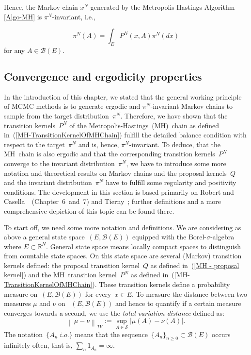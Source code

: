 Hence, the Markov chain $ x^{N} $ generated by the Metropolis-Hastings Algorithm \ref{Algo-MH} is $ \pi^{N} $-invariant, i.e.,

\begin{equation}
 \pi^{N} (A) = \int_{E} P^{N}(x,A) \pi^{N}(dx)
\end{equation}
for any $ A \in \mathcal{B}(E) $.



\subsection{Convergence and ergodicity properties}
\label{MH-ConvergenceProperties}

In the introduction of this chapter, we stated that the general working principle of MCMC methods is to generate ergodic and $\pi^{N}$-invariant Markov chains to sample from the target distribution~$\pi^{N}$. Therefore, we have shown that the transition kernels~$P^{N}$ of the Metropolis-Hastings~(MH)~chain as defined in~(\ref{MH-TransitionKernelOfMHChain}) fulfill the detailed balance condition with respect to the target~$\pi^{N}$ and is, hence, $\pi^{N}$-invariant. To deduce, that the MH~chain is also ergodic and that the corresponding transition kernels~$P^{N}$ converge to the invariant distribution~$\pi^{N}$, we have to introduce some more notation and theoretical results on Markov chains and the proposal kernels~$Q$ and the invariant distribution~$\pi^{N}$ have to fulfill some regularity and positivity conditions. The development in this section is based primarily on Robert and Casella~\autocite{Robert2005}~(Chapter~6~and~7) and Tierny~\autocite{Tierny1994}; further definitions and a more comprehensive depiction of this topic can be found there.


To start off, we need some more notation and definitions. We are considering as above a general state space~$ \left( E, \mathcal{B}(E) \right) $ equipped with the Borel-$\sigma$-algebra where $ E \subset \mathbb{R}^{N} $. General state space means locally compact spaces to distinguish from countable state spaces. On this state space are several (Markov) transition kernels defined: the proposal transition kernel~$Q$ as defined in~(\ref{MH - proposal kernel}) and the MH~transition kernel~$P^{N}$ as defined in~(\ref{MH-TransitionKernelOfMHChain}). These transition kernels define a probability measure on~$ \left( E, \mathcal{B}(E) \right) $ for every~$ x \in E $. To measure the distance between two measures $\mu$ and $\nu$ on ~$ \left( E, \mathcal{B}(E) \right) $  and hence to quantify if a certain measure converges towards a second, we use the \textit{total variation distance} defined as:
 \begin{equation}
  \left\| \mu - \nu \right\|_{TV} := \sup_{A \in \mathcal{S}} \left| \mu(A) - \nu(A) \right|.
 \end{equation}
The notation~$\{ A_n \; i.o. \}$ means that the sequence~$ \{A_n\}_{n \geq 0} \subset \mathcal{B}(E) $ occurs infinitely often, that is, $ \sum_n 1_{A_n} = \infty $.


